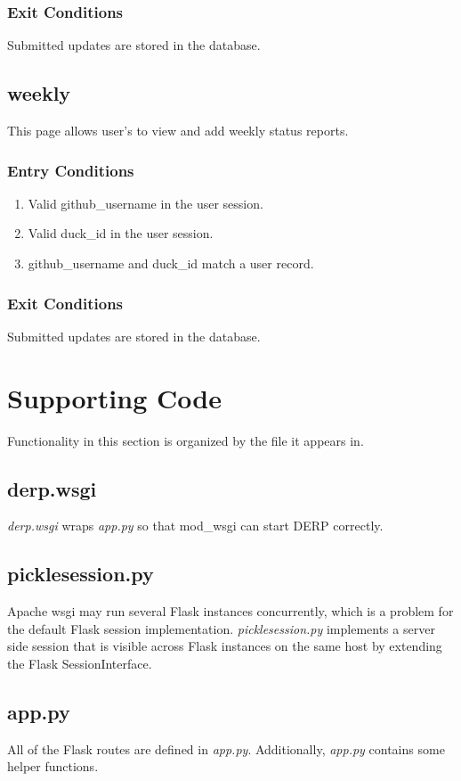 \subsubsection*{Exit Conditions}
Submitted updates are stored in the database.


\subsection*{weekly}
This page allows user's to view and add weekly status reports.

\subsubsection*{Entry Conditions}
\begin{enumerate}
\item Valid github\_username in the user session.
\item Valid duck\_id in the user session.
\item github\_username and duck\_id match a user record.
\end{enumerate}

\subsubsection*{Exit Conditions}
Submitted updates are stored in the database.


\section*{Supporting Code}
Functionality in this section is organized by the file it appears in.

\subsection*{derp.wsgi}
\emph{derp.wsgi} wraps \emph{app.py} so that mod\_wsgi can start DERP correctly. 

\subsection*{picklesession.py}
Apache wsgi may run several Flask instances concurrently, which is a problem for the default Flask session implementation. \emph{picklesession.py} implements a server side session that is visible across Flask instances on the same host by extending the Flask SessionInterface.

\subsection*{app.py}
All of the Flask routes are defined in \emph{app.py}. Additionally, \emph{app.py} contains some helper functions.


